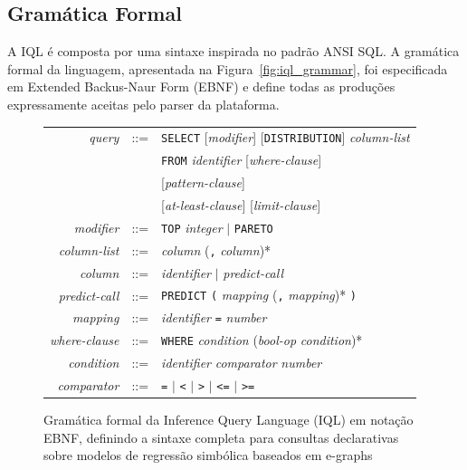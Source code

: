\subsection{Gramática Formal}
A IQL é composta por uma sintaxe inspirada no padrão ANSI SQL. A gramática formal da linguagem, apresentada na Figura~\ref{fig:iql_grammar}, foi especificada em Extended Backus-Naur Form (EBNF) e define todas as produções expressamente aceitas pelo parser da plataforma.

\begin{figure}[htbp]
    \caption{Gramática formal da Inference Query Language (IQL) em notação EBNF, definindo a sintaxe completa para consultas declarativas sobre modelos de regressão simbólica baseados em e-graphs}
    \centering
    \begin{tabular}{rcl}
        \toprule
        \textit{query} & ::= & \texttt{SELECT} [\textit{modifier}] [\texttt{DISTRIBUTION}]
            \textit{column-list} \\
        & & \texttt{FROM} \textit{identifier}
            [\textit{where-clause}] \\
        & & [\textit{pattern-clause}] \\
        & & [\textit{at-least-clause}]
            [\textit{limit-clause}] \\[4pt]
        \textit{modifier} & ::= & \texttt{TOP} \textit{integer}
            $\mid$ \texttt{PARETO} \\[4pt]
        \textit{column-list} & ::= & \textit{column}
            (\texttt{,} \textit{column})* \\[4pt]
        \textit{column} & ::= & \textit{identifier}
            $\mid$ \textit{predict-call} \\[4pt]
        \textit{predict-call} & ::= & \texttt{PREDICT} \texttt{(} \textit{mapping}
            (\texttt{,} \textit{mapping})* \texttt{)} \\[4pt]
        \textit{mapping} & ::= & \textit{identifier} \texttt{=} \textit{number} \\[4pt]
        \textit{where-clause} & ::= & \texttt{WHERE} \textit{condition}
            (\textit{bool-op} \textit{condition})* \\[4pt]
        \textit{condition} & ::= & \textit{identifier} \textit{comparator}
            \textit{number} \\[4pt]
        \textit{comparator} & ::= & \texttt{=} $\mid$ \texttt{<} $\mid$ \texttt{>}
            $\mid$ \texttt{<=} $\mid$ \texttt{>=} \\[4pt]

\end{tabular}
\end{figure}
